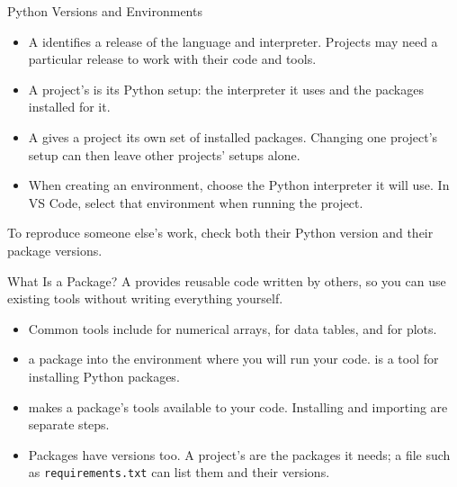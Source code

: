 \begin{frame}{Python Versions and Environments}
\begin{itemize}
\item A  identifies a release of the language and interpreter. Projects may need a particular release to work with their code and tools.
\item A project's  is its Python setup: the interpreter it uses and the packages installed for it.
\item A  gives a project its own set of installed packages. Changing one project's setup can then leave other projects' setups alone.
\item When creating an environment, choose the Python interpreter it will use. In VS Code, select that environment when running the project.
\end{itemize}
\medskip
To reproduce someone else's work, check both their Python version and their package versions.
\end{frame}

\begin{frame}{What Is a Package?}
A  provides reusable code written by others, so you can use existing tools without writing everything yourself.
\par\medskip
\begin{itemize}
\item Common tools include  for numerical arrays,  for data tables, and  for plots.
\item {} a package into the environment where you will run your code.  is a tool for installing Python packages.
\item {} makes a package's tools available to your code. Installing and importing are separate steps.
\item Packages have versions too. A project's  are the packages it needs; a file such as \texttt{requirements.txt} can list them and their versions.
\end{itemize}
\end{frame}

